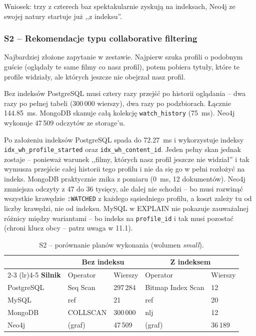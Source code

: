 Wniosek: trzy z czterech baz spektakularnie zyskują na indeksach,
Neo4j ze swojej natury startuje już ,,z indeksu''.

\subsubsection*{S2 -- Rekomendacje typu collaborative filtering}

Najbardziej złożone zapytanie w zestawie. Najpierw szuka profili
o podobnym guście (oglądały te same filmy co nasz profil), potem
pobiera tytuły, które te profile widziały, ale których jeszcze nie
obejrzał nasz profil.

Bez indeksów PostgreSQL musi cztery razy przejść po historii
oglądania -- dwa razy po pełnej tabeli (300\,000 wierszy), dwa razy
po podzbiorach. Łącznie 144.85~ms. MongoDB skanuje całą kolekcję
\texttt{watch\_history} (75~ms). Neo4j wykonuje 47\,509 odczytów
ze storage'u.

Po założeniu indeksów PostgreSQL spada do 72.27~ms i wykorzystuje
indeksy \\\texttt{idx\_wh\_profile\_started} oraz
\texttt{idx\_wh\_content\_id}. Jeden pełny skan jednak zostaje --
ponieważ warunek ,,filmy, których nasz profil jeszcze nie widział''
i tak wymusza przejście całej historii tego profilu i nie da się
go w pełni rozłożyć na indeks. MongoDB praktycznie znika z pomiaru
(0~ms, 12 dokumentów). Neo4j zmniejsza odczyty z 47 do 36 tysięcy,
ale dalej nie schodzi -- bo musi rozwinąć wszystkie krawędzie
\texttt{:WATCHED} z każdego sąsiedniego profilu, a koszt zależy
tu od liczby krawędzi, nie od indeksu. MySQL w EXPLAIN nie pokazuje
zauważalnej różnicy między wariantami -- bo indeks na
\texttt{profile\_id} i tak musi pozostać (chroni klucz obcy --
patrz uwaga w 11.1).

\begin{table}[H]
    \centering
    \small
    \begin{tabular}{lllll}
        \toprule
        & \multicolumn{2}{c}{\textbf{Bez indeksu}} & \multicolumn{2}{c}{\textbf{Z indeksem}} \\
        \cmidrule(lr){2-3} \cmidrule(lr){4-5}
        \textbf{Silnik} & Operator & Wierszy & Operator & Wierszy \\
        \midrule
        PostgreSQL & Seq Scan & 297\,284 & Bitmap Index Scan & 12 \\
        MySQL      & ref      & 21       & ref               & 20 \\
        MongoDB    & COLLSCAN & 300\,000 & nlj               & 12 \\
        Neo4j      & (graf)   & 47\,509  & (graf)            & 36\,189 \\
        \bottomrule
    \end{tabular}
    \caption{S2 -- porównanie planów wykonania (wolumen \emph{small}).}
    \label{tab:explain_s2}
\end{table}

